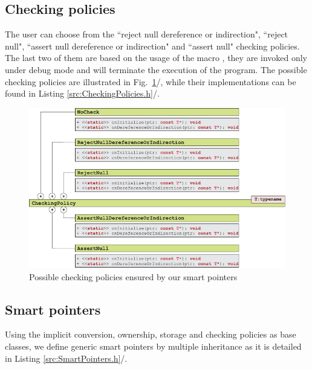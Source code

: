 \documentclass[b5paper, twosided]{book}
\newcommand{\CRed}[1]{{\color[rgb]{0.5, 0.0, 0.0}{#1}}}
\DeclareRobustCommand{\mref}[1]{\ref{#1}{\relsize{-1}/\pageref{#1}}}
\begin{document}

\subsection{Checking policies}

The user can choose from the ``reject null dereference or indirection", ``reject null", ``assert null dereference or indirection" and ``assert null" checking policies. The last two of them are based on the usage of the macro \CRed{assert}, they are invoked only under debug mode and will terminate the execution of the program. The possible checking policies are illustrated in Fig.\ \mref{fig:UMLCheckingPolicy}, while their implementations can be found in Listing \mref{src:CheckingPolicies.h}. 

\begin{figure}[!h]
	\centering
	\includegraphics[]{images/UMLCheckingPolicy.pdf}
	\caption{Possible checking policies ensured by our smart pointers}
	\label{fig:UMLCheckingPolicy}
\end{figure}




\subsection{Smart pointers}

Using the implicit conversion, ownership, storage and checking policies as base classes, we define generic smart pointers by multiple inheritance as it is detailed in Listing \mref{src:SmartPointers.h}.
\end{document}
